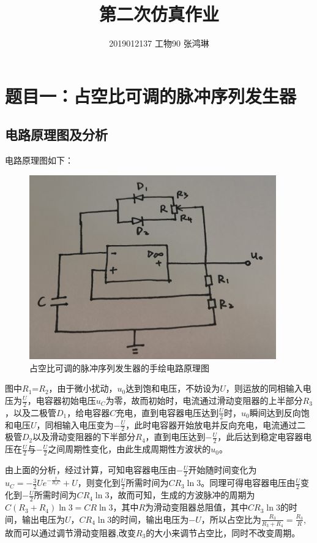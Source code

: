 \documentclass[UTF8]{ctexart}
\begin{document}
\title{第二次仿真作业}
\author{2019012137  工物90  张鸿琳}
\maketitle

\tableofcontents
\newpage

\section{题目一：占空比可调的脉冲序列发生器}
\subsection{电路原理图及分析}
电路原理图如下：
\begin{figure}[H]
\centering
\includegraphics[width=0.95\textwidth]{A.jpg}
\caption{占空比可调的脉冲序列发生器的手绘电路原理图}
\end{figure}

图中$R_1$=$R_2$，由于微小扰动，$u_0$达到饱和电压，不妨设为$U$，则运放的同相输入电压为$\frac{U}{2}$，电容器初始电压$u_C$为零，故而初始时，电流通过滑动变阻器的上半部分$R_3$，以及二极管$D_1$，给电容器$C$充电，直到电容器电压达到$\frac{U}{2}$时，$u_0$瞬间达到反向饱和电压$U$，同相输入电压变为$-\frac{U}{2}$，此时电容器开始放电并反向充电，电流通过二极管$D_2$以及滑动变阻器的下半部分$R_4$，直到电压达到$-\frac{U}{2}$，此后达到稳定电容器电压在$\frac{U}{2}$与$-\frac{U}{2}$之间周期性变化，由此生成周期性方波状的$u_0$。

由上面的分析，经过计算，可知电容器电压由$-\frac{U}{2}$开始随时间变化为$u_C=-\frac{3}{2}Ue^{-\frac{t}{R_3C}}+U$，则变化到$\frac{U}{2}$所需时间为$CR_3\ln3$。同理可得电容器电压由$\frac{U}{2}$变化到$-\frac{U}{2}$所需时间为$CR_4\ln3$，故而可知，生成的方波脉冲的周期为$C(R_3+R_4)\ln3=CR\ln3$，其中$R$为滑动变阻器总阻值，其中$CR_3\ln3$的时间，输出电压为$U$，$CR_4\ln3$的时间，输出电压为$-U$，所以占空比为$\frac{R_3}{R_3+R_4}=\frac{R_3}{R}$,故而可以通过调节滑动变阻器,改变$R_3$的大小来调节占空比，同时不改变周期。
\end{document}
